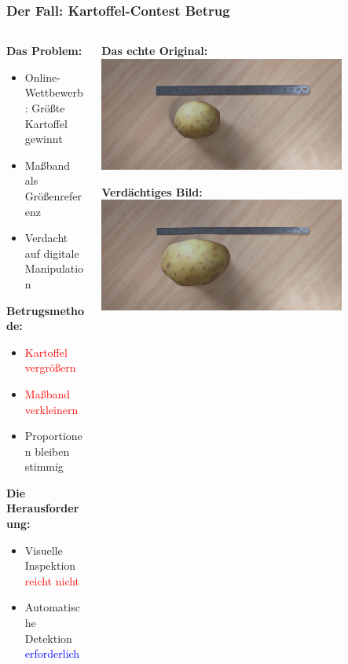 \documentclass[11pt,t,usepdftitle=false,aspectratio=169]{beamer}
\begin{document}
\begin{frame}
	\frametitle{Der Fall: Kartoffel-Contest Betrug}
	
	\begin{columns}[T]
		\begin{column}{0.6\textwidth}
			\textbf{Das Problem:}
			\begin{itemize}
				\item Online-Wettbewerb: Größte Kartoffel gewinnt
				\item Maßband als Größenreferenz
				\item Verdacht auf digitale Manipulation
			\end{itemize}
			
			\textbf{Betrugsmethode:}
			\begin{itemize}
				\item \textcolor{red}{Kartoffel vergrößern}
				\item \textcolor{red}{Maßband verkleinern}
				\item Proportionen bleiben stimmig
			\end{itemize}
			
			\textbf{Die Herausforderung:}
			\begin{itemize}
				\item Visuelle Inspektion \textcolor{red}{reicht nicht}
				\item Automatische Detektion \textcolor{blue}{erforderlich}
			\end{itemize}
		\end{column}
		\begin{column}{0.4\textwidth}
			\centering
			\textbf{Das echte Original:}
			\vspace{0.3em}
			\includegraphics[width=0.8\textwidth]{images/image_2.jpg}
			\vspace{0.2em}
			
			\textbf{Verdächtiges Bild:}
			\vspace{0.3em}
			\includegraphics[width=0.8\textwidth]{images/image_2_s.jpg}
			\vspace{0.2em}
		\end{column}
	\end{columns}
\end{frame}
\end{document}

